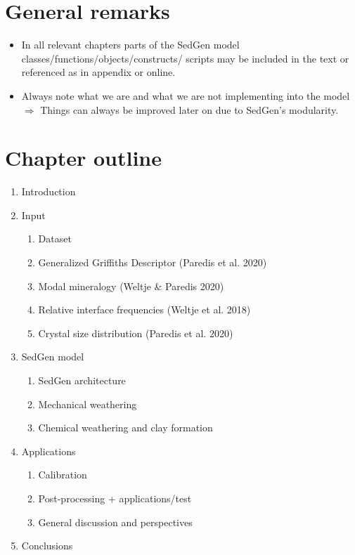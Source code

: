 \section{General remarks}
    \begin{itemize}
        \item In all relevant chapters parts of the SedGen model classes/functions/objects/constructs/ scripts may be included in the text or referenced as in appendix or online. %
        \item Always note what we are and what we are not implementing into the model \(\Rightarrow\) Things can always be improved later on due to SedGen’s modularity. %
    \end{itemize}


\section{Chapter outline}
    \begin{enumerate}
        \item Introduction

        \item Input
        \begin{enumerate}
            \item Dataset
            \item Generalized Griffiths Descriptor (Paredis et al. 2020)
            \item Modal mineralogy (Weltje \& Paredis 2020)
            \item Relative interface frequencies (Weltje et al. 2018)
            \item Crystal size distribution (Paredis et al. 2020)
        \end{enumerate}

        \item SedGen model
        \begin{enumerate}
            \item SedGen architecture
            \item Mechanical weathering
            \item Chemical weathering and clay formation
        \end{enumerate}

        \item Applications
        \begin{enumerate}
            \item Calibration
            \item Post-processing + applications/test
            \item General discussion and perspectives
        \end{enumerate}

        \item Conclusions
    \end{enumerate}


